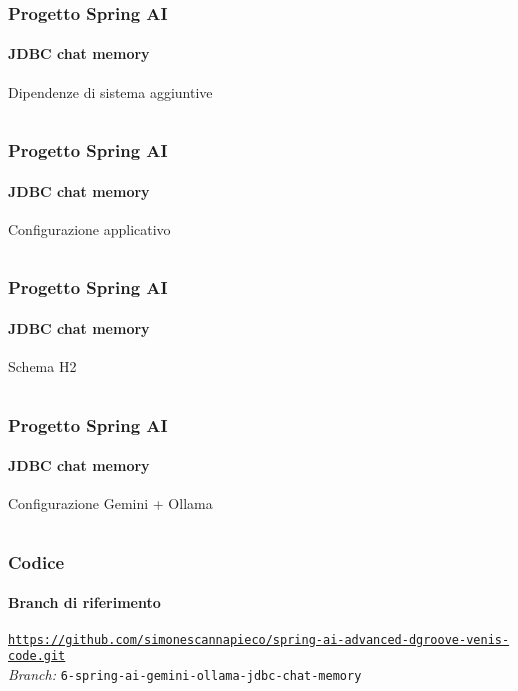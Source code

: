%
\begin{frame}[t,fragile] \frametitle{Progetto Spring AI}
    \framesubtitle{JDBC chat memory}
        \begin{block}{Dipendenze di sistema aggiuntive}
			{\tiny\inputminted{xml}{code/pom-3.xml}}
    	\end{block}
\end{frame}
%
\begin{frame}[t,fragile] \frametitle{Progetto Spring AI}
    \framesubtitle{JDBC chat memory}
        \begin{block}{Configurazione applicativo}
			{\tiny\inputminted{yaml}{code/application-2.yml}}
    	\end{block}
\end{frame}
%
\begin{frame}[t,fragile] \frametitle{Progetto Spring AI}
    \framesubtitle{JDBC chat memory}
        \vspace*{-.7cm}
        \begin{block}{Schema H2}
			{\tiny\inputminted{sql}{code/schema-h2.sql}}
    	\end{block}
\end{frame}
%
\begin{frame}[t,fragile] \frametitle{Progetto Spring AI}
    \framesubtitle{JDBC chat memory}
    	\vspace*{-.7cm}
        \begin{block}{Configurazione Gemini + Ollama}
			{\tiny\inputminted{java}{code/MemoryChatClientConfig.java}}
    	\end{block}
\end{frame}
%
\begin{frame}[fragile] \frametitle{Codice}
    \framesubtitle{Branch di riferimento}
	\begin{center}
		{\scriptsize \href{https://github.com/simonescannapieco/spring-ai-advanced-dgroove-venis-code.git}{\texttt{https://github.com/simonescannapieco/spring-ai-advanced-dgroove-venis-code.git}}}\\
		\textit{Branch:} \alert{\texttt{6-spring-ai-gemini-ollama-jdbc-chat-memory}}
	\end{center}
\end{frame}